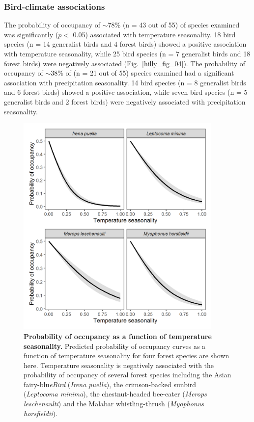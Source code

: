 \subsubsection*{Bird-climate associations}

The probability of occupancy of $\sim$78\% (n = 43 out of 55) of species examined was significantly ($p <$ 0.05) associated with temperature seasonality.
18 bird species (n = 14 generalist birds and 4 forest birds) showed a positive association with temperature seasonality, while 25 bird species (n = 7 generalist birds and 18 forest birds) were negatively associated (Fig.~\ref{hilly_fig_04}).
The probability of occupancy of $\sim$38\% of (n = 21 out of 55) species examined had a significant association with precipitation seasonality.
14 bird species (n = 8 generalist birds and 6 forest birds) showed a positive association, while seven bird species (n = 5 generalist birds and 2 forest birds) were negatively associated with precipitation seasonality.

\begin{figure}[h!]
    \centering
    \includegraphics[width=0.9\textwidth]{figures/hillybirds/fig_05.png}
    \caption{
        \textbf{Probability of occupancy as a function of temperature seasonality.}
        Predicted probability of occupancy curves as a function of temperature seasonality for four forest species are shown here. 
        Temperature seasonality is negatively associated with the probability of occupancy of several forest species including the Asian fairy-blu\textit{eBird} (\textit{Irena puella}), the crimson-backed sunbird (\textit{Leptocoma minima}), the chestnut-headed bee-eater (\textit{Merops leschenaulti}) and the Malabar whistling-thrush (\textit{Myophonus horsfieldii}).
    }
    \label{hilly_fig_05}
\end{figure}

